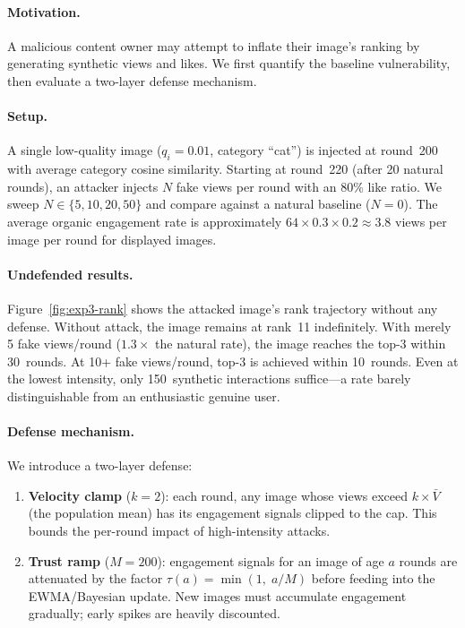 \paragraph{Motivation.}
A malicious content owner may attempt to inflate their image's ranking
by generating synthetic views and likes.  We first quantify the
baseline vulnerability, then evaluate a two-layer defense mechanism.

\paragraph{Setup.}
A single low-quality image ($q_i{=}0.01$, category ``cat'') is
injected at round~200 with average category cosine similarity.
Starting at round~220 (after 20 natural rounds), an attacker injects
$N$ fake views per round with an 80\% like ratio.  We sweep
$N \in \{5, 10, 20, 50\}$ and compare against a natural baseline
($N{=}0$).  The average organic engagement rate is approximately
$64 \times 0.3 \times 0.2 \approx 3.8$ views per image per round for
displayed images.

\paragraph{Undefended results.}
Figure~\ref{fig:exp3-rank} shows the attacked image's rank trajectory
without any defense.  Without attack, the image remains at rank~11
indefinitely.  With merely 5 fake views/round ($1.3\times$ the natural
rate), the image reaches the top-3 within 30~rounds.  At 10+ fake
views/round, top-3 is achieved within 10~rounds.  Even at the lowest
intensity, only 150~synthetic interactions suffice---a rate barely
distinguishable from an enthusiastic genuine user.

\paragraph{Defense mechanism.}
We introduce a two-layer defense:
\begin{enumerate}
  \item \textbf{Velocity clamp} ($k{=}2$): each round, any image
        whose views exceed $k \times \bar{V}$ (the population mean)
        has its engagement signals clipped to the cap.  This bounds
        the per-round impact of high-intensity attacks.
  \item \textbf{Trust ramp} ($M{=}200$): engagement signals for an
        image of age $a$ rounds are attenuated by the factor
        $\tau(a) = \min(1,\; a / M)$ before feeding into the
        EWMA/Bayesian update.  New images must accumulate engagement
        gradually; early spikes are heavily discounted.
\end{enumerate}

